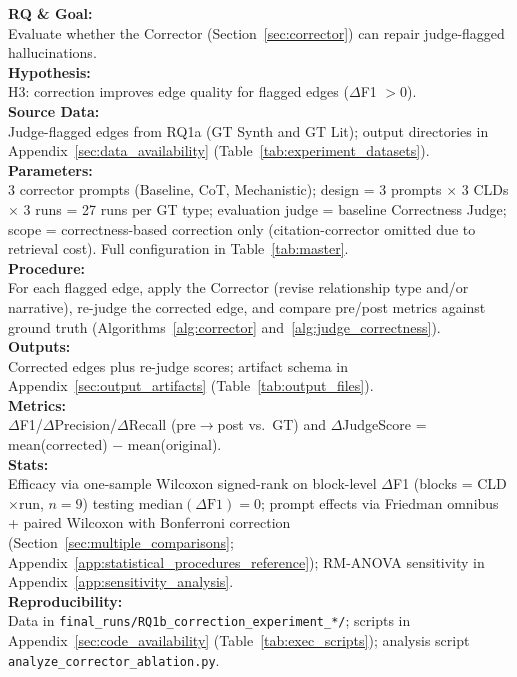 \noindent\textbf{RQ \& Goal:}\\
Evaluate whether the Corrector (Section~\ref{sec:corrector}) can repair judge-flagged hallucinations.\\
\textbf{Hypothesis:}\\
H3: correction improves edge quality for flagged edges ($\Delta$F1 $> 0$).\\
\textbf{Source Data:}\\
Judge-flagged edges from RQ1a (GT Synth and GT Lit); output directories in Appendix~\ref{sec:data_availability} (Table~\ref{tab:experiment_datasets}).\\
\textbf{Parameters:}\\
3 corrector prompts (Baseline, CoT, Mechanistic); design = 3 prompts $\times$ 3 CLDs $\times$ 3 runs = 27 runs per GT type; evaluation judge = baseline Correctness Judge; scope = correctness-based correction only (citation-corrector omitted due to retrieval cost). Full configuration in Table~\ref{tab:master}.\\
\textbf{Procedure:}\\
For each flagged edge, apply the Corrector (revise relationship type and/or narrative), re-judge the corrected edge, and compare pre/post metrics against ground truth (Algorithms~\ref{alg:corrector} and~\ref{alg:judge_correctness}).\\
\textbf{Outputs:}\\
Corrected edges plus re-judge scores; artifact schema in Appendix~\ref{sec:output_artifacts} (Table~\ref{tab:output_files}).\\
\textbf{Metrics:}\\
$\Delta$F1/$\Delta$Precision/$\Delta$Recall (pre$\rightarrow$post vs.\ GT) and $\Delta$JudgeScore = mean(corrected) $-$ mean(original).\\
\textbf{Stats:}\\
Efficacy via one-sample Wilcoxon signed-rank on block-level $\Delta$F1 (blocks = CLD$\times$run, $n{=}9$) testing median$(\Delta\mathrm{F1})=0$; prompt effects via Friedman omnibus + paired Wilcoxon with Bonferroni correction (Section~\ref{sec:multiple_comparisons}; Appendix~\ref{app:statistical_procedures_reference}); RM-ANOVA sensitivity in Appendix~\ref{app:sensitivity_analysis}.\\
\textbf{Reproducibility:}\\
Data in \texttt{final\_runs/RQ1b\_correction\_experiment\_*/}; scripts in Appendix~\ref{sec:code_availability} (Table~\ref{tab:exec_scripts}); analysis script \texttt{analyze\_corrector\_ablation.py}.

